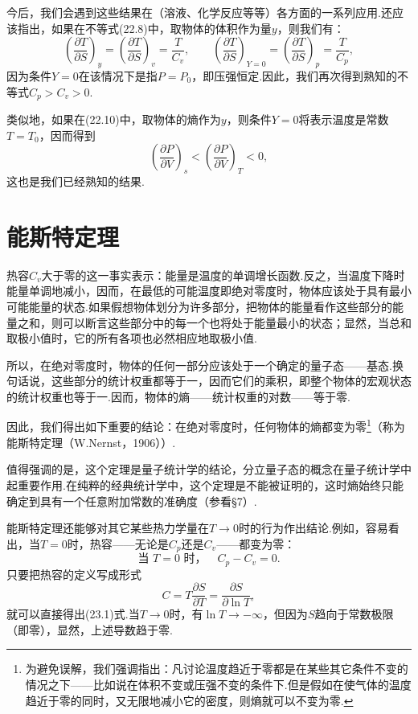 今后，我们会遇到这些结果在（溶液、化学反应等等）各方面的一系列应用.还应该指出，如果在不等式(22.8)中，取物体的体积作为量$y$，则我们有：
\begin{equation*}
  \left(\frac{\partial T}{\partial S}\right)_y
  =\left(\frac{\partial T}{\partial S}\right)_v
  =\frac{T}{C_v},\qquad
  \left(\frac{\partial T}{\partial S}\right)_{Y=0}
  =\left(\frac{\partial T}{\partial S}\right)_p
  =\frac{T}{C_p},
\end{equation*}
因为条件$Y=0$在该情况下是指$P=P_0$，即压强恒定.因此，我们再次得到熟知的不等式$C_p>C_v>0$.

类似地，如果在(22.10)中，取物体的熵作为$y$，则条件$Y=0$将表示温度是常数$T=T_0$，因而得到
\begin{equation*}
  \left(\frac{\partial P}{\partial V}\right)_s
  <\left(\frac{\partial P}{\partial V}\right)_T<0,
\end{equation*}
这也是我们已经熟知的结果.

\section{能斯特定理}

热容$C_v$大于零的这一事实表示：能量是温度的单调增长函数.反之，当温度下降时能量单调地减小，因而，在最低的可能温度即绝对零度时，物体应该处于具有最小可能能量的状态.如果假想物体划分为许多部分，把物体的能量看作这些部分的能量之和，则可以断言这些部分中的每一个也将处于能量最小的状态；显然，当总和取极小值时，它的所有各项也必然相应地取极小值.

所以，在绝对零度时，物体的任何一部分应该处于一个确定的量子态——基态.换句话说，这些部分的统计权重都等于一，因而它们的乘积，即整个物体的宏观状态的统计权重也等于一.因而，物体的熵——统计权重的对数——等于零.

因此，我们得出如下重要的结论：在绝对零度时，任何物体的熵都变为零\footnote{为避免误解，我们强调指出：凡讨论温度趋近于零都是在某些其它条件不变的情况之下——比如说在体积不变或压强不变的条件下.但是假如在使气体的温度趋近于零的同时，又无限地减小它的密度，则熵就可以不变为零.}（称为能斯特定理（W.Nernst，1906））.

值得强调的是，这个定理是量子统计学的结论，分立量子态的概念在量子统计学中起重要作用.在纯粹的经典统计学中，这个定理是不能被证明的，这时熵始终只能确定到具有一个任意附加常数的准确度（参看§7）.

能斯特定理还能够对其它某些热力学量在$T\to0$时的行为作出结论.例如，容易看出，当$T=0$时，热容——无论是$C_p$还是$C_v$——都变为零：
\begin{equation}
  \text{当~$T=0$~时，}\quad C_p-C_v=0.
\end{equation}
只要把热容的定义写成形式
\begin{equation*}
  C=T\frac{\partial S}{\partial T}
  =\frac{\partial S}{\partial\ln T},
\end{equation*}
就可以直接得出(23.1)式.当$T\to0$时，有$\ln T\to-\infty$，但因为$S$趋向于常数极限（即零），显然，上述导数趋于零.

